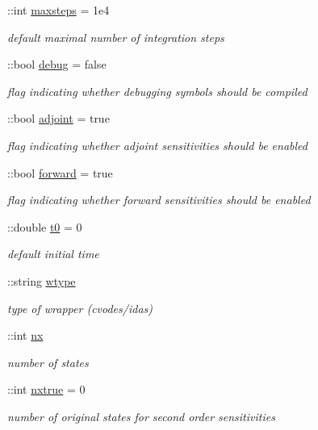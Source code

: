 \begin{DoxyCompactItemize}
\+::int \hyperlink{classamimodel_ac37622882dacee1f11688d4941ccb45e}{maxsteps} = 1e4
\begin{DoxyCompactList}\small\item\em default maximal number of integration steps \end{DoxyCompactList}\item 
\+::bool \hyperlink{classamimodel_a0514aabed091ee5e2f35766eb01eced6}{debug} = false
\begin{DoxyCompactList}\small\item\em flag indicating whether debugging symbols should be compiled \end{DoxyCompactList}\item 
\+::bool \hyperlink{classamimodel_ab6d500b41cf50693452415caca31d32e}{adjoint} = true
\begin{DoxyCompactList}\small\item\em flag indicating whether adjoint sensitivities should be enabled \end{DoxyCompactList}\item 
\+::bool \hyperlink{classamimodel_a81e42e48c9c72814166c8f7cd414ce24}{forward} = true
\begin{DoxyCompactList}\small\item\em flag indicating whether forward sensitivities should be enabled \end{DoxyCompactList}\item 
\+::double \hyperlink{classamimodel_abdb5a42ffee3ca622484b53a322f1004}{t0} = 0
\begin{DoxyCompactList}\small\item\em default initial time \end{DoxyCompactList}\item 
\+::string \hyperlink{classamimodel_a5376250224ce32fb558d88aa0b5a93ff}{wtype}
\begin{DoxyCompactList}\small\item\em type of wrapper (cvodes/idas) \end{DoxyCompactList}\item 
\+::int \hyperlink{classamimodel_a84e4236f07668a770c27567f1f9615ff}{nx}
\begin{DoxyCompactList}\small\item\em number of states \end{DoxyCompactList}\item 
\+::int \hyperlink{classamimodel_a49c476de14a021114feb8c95da04952a}{nxtrue} = 0
\begin{DoxyCompactList}\small\item\em number of original states for second order sensitivities \end{DoxyCompactList}\item 

\end{DoxyCompactItemize}
